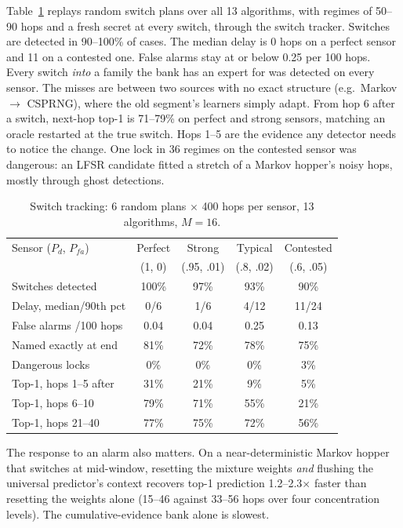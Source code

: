 Table~\ref{tab:switch} replays random switch plans over all 13 algorithms, with
regimes of 50--90 hops and a fresh secret at every switch, through the
switch tracker. Switches are detected in 90--100\% of cases. The median delay is
0 hops on a perfect sensor and 11 on a contested one. False alarms stay at or
below 0.25 per 100 hops. Every switch \emph{into} a family the bank has an
expert for was detected on every sensor. The misses are between two sources
with no exact structure (e.g.\ Markov $\to$ CSPRNG), where the old segment's
learners simply adapt. From hop 6 after a switch, next-hop top-1 is 71--79\% on
perfect and strong sensors, matching an oracle restarted at the true switch.
Hops 1--5 are the evidence any detector needs to notice the change. One lock
in 36 regimes on the contested sensor was dangerous: an LFSR candidate fitted a
stretch of a Markov hopper's noisy hops, mostly through ghost detections.

\begin{table}[t]
\centering
\caption{Switch tracking: 6 random plans $\times$ 400 hops per sensor, 13
algorithms, $M=16$.\stale}
\label{tab:switch}
\setlength{\tabcolsep}{3pt}
\begin{tabular}{lcccc}
\toprule
Sensor ($P_d$, $P_{fa}$) & Perfect & Strong & Typical & Contested \\
& (1, 0) & (.95, .01) & (.8, .02) & (.6, .05) \\
\midrule
Switches detected      & 100\% & 97\% & 93\% & 90\% \\
Delay, median/90th pct & 0/6 & 1/6 & 4/12 & 11/24 \\
False alarms /100 hops & 0.04 & 0.04 & 0.25 & 0.13 \\
Named exactly at end   & 81\% & 72\% & 78\% & 75\% \\
Dangerous locks        & 0\% & 0\% & 0\% & 3\% \\
\midrule
Top-1, hops 1--5 after & 31\% & 21\% & 9\%  & 5\% \\
Top-1, hops 6--10      & 79\% & 71\% & 55\% & 21\% \\
Top-1, hops 21--40     & 77\% & 75\% & 72\% & 56\% \\
\bottomrule
\end{tabular}
\end{table}

The response to an alarm also matters. On a near-deterministic Markov hopper
that switches at mid-window, resetting the mixture weights \emph{and} flushing
the universal predictor's context recovers top-1 prediction 1.2--2.3$\times$
faster than resetting the weights alone\stale{} (15--46 against 33--56 hops
over four concentration levels). The cumulative-evidence bank alone is slowest.

